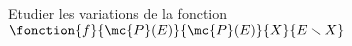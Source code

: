 \exercice

Etudier les variations de la fonction $\fonction{f}{\mc{P}(E)}{\mc{P}(E)}{X}{E \smallsetminus X}$










